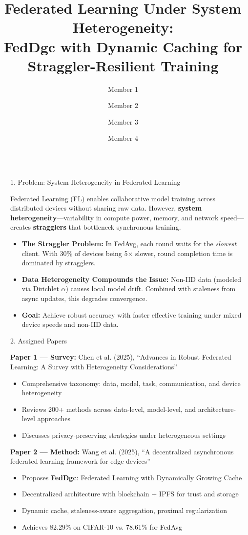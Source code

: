 \documentclass[final]{beamer}
\title{Federated Learning Under System Heterogeneity:\\FedDgc with Dynamic Caching for Straggler-Resilient Training}
\author{Member 1 \and Member 2 \and Member 3 \and Member 4}
\institute[shortinst]{IIT Patna --- BDS Program --- Category 7: System Heterogeneity}
\newlength{\sepwidth}
\newlength{\colwidth}
\newcommand{\separatorcolumn}{\begin{column}{\sepwidth}\end{column}}
\begin{document}
\begin{frame}[t]
\begin{columns}[t]
\separatorcolumn

\begin{column}{\colwidth}

  \begin{block}{1. Problem: System Heterogeneity in Federated Learning}

    Federated Learning (FL) enables collaborative model training across distributed devices without sharing raw data. However, \textbf{system heterogeneity}---variability in compute power, memory, and network speed---creates \textbf{stragglers} that bottleneck synchronous training.

    \begin{itemize}
      \item \textbf{The Straggler Problem:} In FedAvg, each round waits for the \textit{slowest} client. With 30\% of devices being 5$\times$ slower, round completion time is dominated by stragglers.
      \item \textbf{Data Heterogeneity Compounds the Issue:} Non-IID data (modeled via Dirichlet $\alpha$) causes local model drift. Combined with staleness from async updates, this degrades convergence.
      \item \textbf{Goal:} Achieve robust accuracy with faster effective training under mixed device speeds and non-IID data.
    \end{itemize}

  \end{block}

  \begin{block}{2. Assigned Papers}

    \textbf{Paper 1 --- Survey:} Chen et al. (2025), ``Advances in Robust Federated Learning: A Survey with Heterogeneity Considerations''
    \begin{itemize}
      \item Comprehensive taxonomy: data, model, task, communication, and device heterogeneity
      \item Reviews 200+ methods across data-level, model-level, and architecture-level approaches
      \item Discusses privacy-preserving strategies under heterogeneous settings
    \end{itemize}

    \vspace{0.5em}
    \textbf{Paper 2 --- Method:} Wang et al. (2025), ``A decentralized asynchronous federated learning framework for edge devices''
    \begin{itemize}
      \item Proposes \textbf{FedDgc}: Federated Learning with Dynamically Growing Cache
      \item Decentralized architecture with blockchain + IPFS for trust and storage
      \item Dynamic cache, staleness-aware aggregation, proximal regularization
      \item Achieves 82.29\% on CIFAR-10 vs. 78.61\% for FedAvg
    \end{itemize}


\end{block}
\end{column}
\end{columns}
\end{frame}
\end{document}
